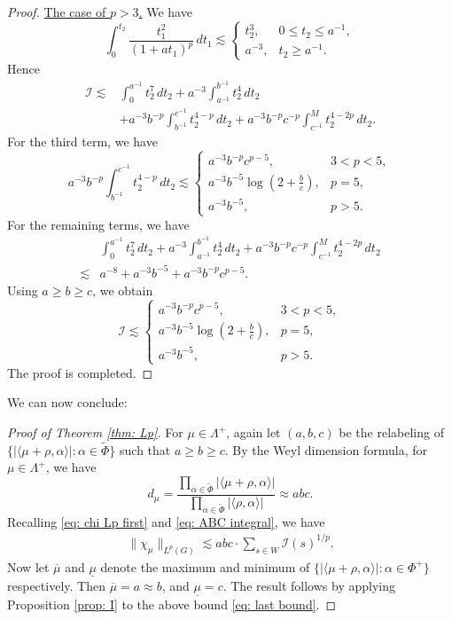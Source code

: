 \documentclass{amsart}
\numberwithin{equation}{section}
\numberwithin{equation}{section}
\begin{document}
\begin{proof}
\underline{The case of \(p>3\).} We have 
\[
\int_0^{t_2}\frac{t_1^2}{(1+at_1)^p}\,dt_1
\lesssim
\begin{cases}
t_2^3, & 0\le t_2\le a^{-1},\\[1mm]
a^{-3}, & t_2\ge a^{-1}.
\end{cases}
\]
Hence
\begin{align*}
\mathcal I
\lesssim & 
\int_0^{a^{-1}} t_2^7\,dt_2
+a^{-3}\int_{a^{-1}}^{b^{-1}} t_2^4\,dt_2
 \\
&+a^{-3}b^{-p}\int_{b^{-1}}^{c^{-1}} t_2^{4-p}\,dt_2+a^{-3}b^{-p}c^{-p}\int_{c^{-1}}^M t_2^{4-2p}\,dt_2.
\end{align*}
For the third term, we have 
\[
a^{-3}b^{-p}\int_{b^{-1}}^{c^{-1}} t_2^{4-p}\,dt_2
\lesssim
\begin{cases}
a^{-3}b^{-p}c^{p-5}, & 3<p<5,\\[1mm]
a^{-3}b^{-5}\log\left(2+\frac bc\right), & p=5,\\[1mm]
a^{-3}b^{-5}, & p>5.
\end{cases}
\]
For the remaining terms, we have 
\begin{align*}
    & \int_0^{a^{-1}} t_2^7\,dt_2
+a^{-3}\int_{a^{-1}}^{b^{-1}} t_2^4\,dt_2
 +a^{-3}b^{-p}c^{-p}\int_{c^{-1}}^M t_2^{4-2p}\,dt_2 \\ 
 \lesssim & a^{-8}+a^{-3}b^{-5}+a^{-3}b^{-p}c^{p-5}. 
\end{align*}
Using $a\geq b\geq c$, we obtain
\[
\mathcal I\lesssim
\begin{cases}
a^{-3}b^{-p}c^{p-5}, & 3<p<5,\\[1mm]
a^{-3}b^{-5}\log\left(2+\frac bc\right), & p=5,\\[1mm]
a^{-3}b^{-5}, & p>5.
\end{cases}
\]
The proof is completed. 
\end{proof}

We can now conclude:

\begin{proof}[Proof of Theorem \ref{thm: Lp}]
For $\mu\in\Lambda^+$, again let $(a,b,c)$ be the relabeling of 
$\{|\langle \mu+\rho,\alpha\rangle| : \alpha \in \widetilde{\Phi}\}$ such that $a\geq b\geq c$. 
By the Weyl dimension formula, for $\mu\in\Lambda^+$, we have 
$$d_\mu=\frac{\prod_{\alpha\in\widetilde{\Phi}}|\langle\mu+\rho,\alpha\rangle|}{\prod_{\alpha\in\widetilde{\Phi}}|\langle\rho,\alpha\rangle|}\approx abc.$$ 
Recalling \eqref{eq: chi Lp first} and \eqref{eq: ABC integral}, we have 
\begin{align}\label{eq: last bound}
    \|\chi_\mu\|_{L^p(G)}
\lesssim abc\cdot \sum_{s\in W}\mathcal{I}(s)^{1/p}.
\end{align}
Now let $\overline{\mu}$ and $\underline{\mu}$ denote the maximum and minimum of 
$\{|\langle \mu+\rho,\alpha\rangle| : \alpha \in \Phi^+\}$ respectively. Then 
$\overline{\mu}=a\approx b$, and $\underline{\mu}=c$. The result follows by applying Proposition \ref{prop: I} to the above bound \eqref{eq: last bound}. 
\end{proof}




\end{document}
